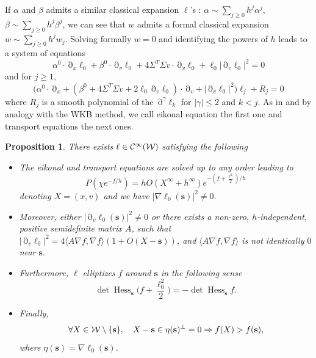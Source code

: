 \documentclass[12pt]{amsart}
\newcommand{\Hess}{\operatorname{Hess}}
\def\<{\langle}
\def\>{\rangle}
\numberwithin{equation}{section}
\numberwithin{figure}{section}
\def\s{\mathbf{s}}
\DeclareMathOperator{\p}{\partial}
\newtheorem{proposition}[defin]{Proposition}
\begin{document}
If $\alpha$ and $\beta$ admits a similar classical expansion $\ell$'s : $\alpha\sim\sum_{j\geq0}h^j\alpha^j$, $\beta\sim\sum_{j\geq0}h^j\beta^j$, we can see that $w$ admits a formal classical expansion $w \sim \sum_{j\geq0} h^jw_j$. Solving formally $w=0$ and identifying the powers of $h$ leads to a system of equations
\begin{equation}\label{eq:eik}\tag{eik}
\alpha^0\cdot \p_x\ell_0 + \beta^0\cdot \p_v\ell_0 + 4\Sigma^T\Sigma v\cdot\p_v\ell_0 + \ell_0|\p_v\ell_0|^2 = 0
\end{equation}
and for $j\geq1$,
\begin{equation}\label{eq:transp}\tag{T$_j$}
\big(\alpha^0\cdot \p_x + (\beta^0+ 4\Sigma^T\Sigma v + 2\ell_0\p_v\ell_0)\cdot\p_v + |\p_v\ell_0|^2\big) \ell_j + R_j = 0
\end{equation}
where $R_j$ is a smooth polynomial of the $\p^\gamma\ell_k$ for $|\gamma|\leq2$ and $k<j$. As in \cite{BoLePMi22} and by analogy with the WKB method, we call eikonal equation the first one and transport equations the next ones.
\begin{proposition}\label{prop:ell}There exists $\ell\in{\mathcal C}^\infty({\mathcal W})$ satisfying the following
    \begin{itemize}
        \item[$i)$] The eikonal and transport equations are solved up to any order leading to
        \begin{equation}\label{eq:Pchiell}
            P(\chi e^{-f/h}) = hO(X^\infty + h^\infty)e^{-(f+\frac{\ell^{2}}{2})/h}
        \end{equation}
        denoting $X=(x,v)$ and we have $|\nabla\ell_{0}(\s)|^2\neq0$.
        \item[$ii)$] Moreover, either $|\p_v\ell_{0}(\s)|^2\neq0$ or there exists a non-zero, $h$-independent, positive semidefinite matrix $A$, such that $|\p_v\ell_{0}|^2 = 4\<A\nabla f,\nabla f\>(1+O(X-\s))$, and $\<A\nabla f,\nabla f\>$ is not identically $0$ near $\s$.
        \item[$iii)$] Furthermore, $\ell$ elliptizes $f$ around $\s$ in the following sense
        \begin{equation}\label{eq:dethess}
        \det\Hess_\s\big(f + \frac{\ell_0^{2}}{2}\big) = -\det\Hess_\s f.
        \end{equation}
        \item[$iv)$] Finally,
        \begin{equation*}
        \forall X\in\www\setminus\{\s\},\ \ \ X-\s\in\eta(\s)^\bot = 0 \Rightarrow f(X) > f(\s),
        \end{equation*}
        where $\eta(\s) = \nabla\ell_{0}(\s)$.
    \end{itemize}
\end{proposition}
\end{document}
